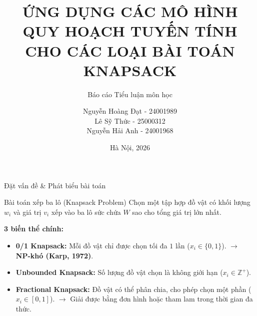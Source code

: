\documentclass[10pt]{beamer}
\title[Ứng dụng mô hình LP cho Knapsack]{ỨNG DỤNG CÁC MÔ HÌNH QUY HOẠCH TUYẾN TÍNH \\ CHO CÁC LOẠI BÀI TOÁN KNAPSACK}
\subtitle{Báo cáo Tiểu luận môn học}
\author[Nguyễn H. Đạt, Lê S. Thức, Nguyễn H. Anh]{
    Nguyễn Hoàng Đạt - 24001989 \\
    Lê Sỹ Thức - 25000312 \\
    Nguyễn Hải Anh - 24001968
}
\institute[HUS]{
    Trường Đại học Khoa học Tự nhiên \\
    Đại học Quốc gia Hà Nội
}
\date[2026]{Hà Nội, 2026}
\begin{document}
\begin{frame}
    \titlepage
\end{frame}

\begin{frame}{Đặt vấn đề \& Phát biểu bài toán}
    \begin{block}{Bài toán xếp ba lô (Knapsack Problem)}
        Chọn một tập hợp đồ vật có khối lượng $w_i$ và giá trị $v_i$ xếp vào ba lô sức chứa $W$ sao cho tổng giá trị lớn nhất.
    \end{block}
    \vspace{0.3em}
    \textbf{3 biến thể chính:}
    \begin{itemize}
        \item \textbf{0/1 Knapsack:} Mỗi đồ vật chỉ được chọn tối đa $1$ lần ($x_i \in \{0,1\}$). $\rightarrow$ \textbf{NP-khó (Karp, 1972)}.
        \item \textbf{Unbounded Knapsack:} Số lượng đồ vật chọn là không giới hạn ($x_i \in \mathbb{Z}^+$).
        \item \textbf{Fractional Knapsack:} Đồ vật có thể phân chia, cho phép chọn một phần ($x_i \in [0,1]$). $\rightarrow$ Giải được bằng đơn hình hoặc tham lam trong thời gian đa thức.
    \end{itemize}
\end{frame}
\end{document}

